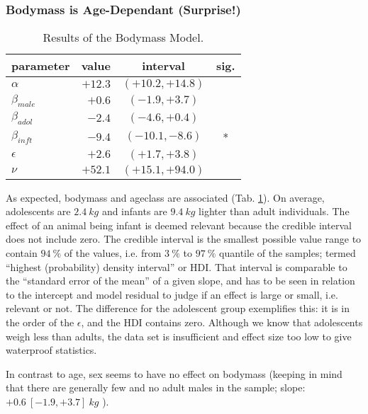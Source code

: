 \subsubsection{Bodymass is Age-Dependant (Surprise!)}
\label{bodymass:results}
\begin{table}[p]
\caption{\label{tab:bodyproportions}Results of the Bodymass Model.}
\centering
\begin{tabular}{|l|r|c|c|}
\hline
\textbf{parameter} & \textbf{value} & \textbf{interval} & \textbf{sig.}\\[0pt]
\hline
\(\alpha\) & \(+12.3\) & \(\left(+10.2, +14.8\right)\) & \\[0pt]
\(\beta_{male}\) & \(+0.6\) & \(\left(-1.9, +3.7\right)\) & \\[0pt]
\(\beta_{adol}\) & \(-2.4\) & \(\left(-4.6, +0.4\right)\) & \\[0pt]
\(\beta_{inft}\) & \(-9.4\) & \(\left(-10.1, -8.6\right)\) & *\\[0pt]
\(\epsilon\) & \(+2.6\) & \(\left(+1.7, +3.8\right)\) & \\[0pt]
\(\nu\) & \(+52.1\) & \(\left(+15.1, +94.0\right)\) & \\[0pt]
\hline
\end{tabular}
\end{table}


As expected, bodymass and ageclass are associated (Tab. \ref{tab:bodyproportions}).
On average, adolescents are \(2.4\ kg\) and infants are \(9.4\ kg\) lighter than adult individuals.
The effect of an animal being infant is deemed relevant because the credible interval does not include zero.
The credible interval is the smallest possible value range to contain \(94\ \%\) of the values, i.e. from \(3\ \%\) to \(97\ \%\) quantile of the samples; termed ``highest (probability) density interval'' or HDI.
That interval is comparable to the ``standard error of the mean'' of a given slope, and has to be seen in relation to the intercept and model residual to judge if an effect is large or small, i.e. relevant or not.
The difference for the adolescent group exemplifies this: it is in the order of the \(\epsilon\), and the HDI contains zero.
Although we know that adolescents weigh less than adults, the data set is insufficient and effect size too low to give waterproof statistics.

In contrast to age, sex seems to have no effect on bodymass (keeping in mind that there are generally few and no adult males in the sample; slope: \(+0.6\ [-1.9, +3.7]\ kg\) ).

